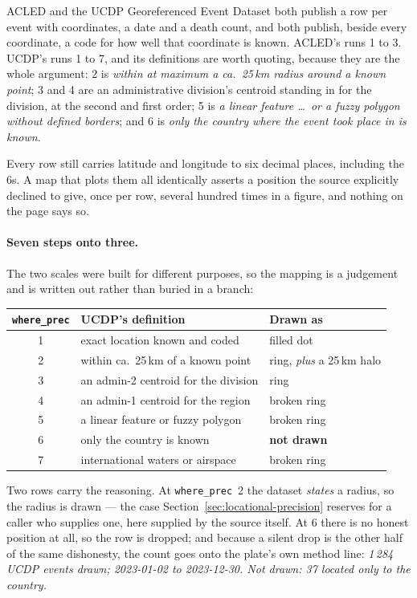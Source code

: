 \documentclass[11pt]{article}
\begin{document}
ACLED \parencite{acled-codebook} and the UCDP Georeferenced Event Dataset
\parencite{sundberg-ucdp-ged, hogbladh-ged-codebook} both publish a row per
event with coordinates, a date and a death count, and both publish, beside
every coordinate, a code for how well that coordinate is known. ACLED's
runs 1 to 3. UCDP's runs 1 to 7, and its definitions are worth quoting,
because they are the whole argument: 2 is \emph{within at maximum a ca.\
25\,km radius around a known point}; 3 and 4 are an administrative
division's centroid standing in for the division, at the second and first
order; 5 is \emph{a linear feature \dots\ or a fuzzy polygon without
defined borders}; and 6 is \emph{only the country where the event took
place in is known}.

Every row still carries latitude and longitude to six decimal places,
including the 6s. A map that plots them all identically asserts a position
the source explicitly declined to give, once per row, several hundred times
in a figure, and nothing on the page says so.

\paragraph{Seven steps onto three.} The two scales were built for different
purposes, so the mapping is a judgement and is written out rather than
buried in a branch:

\begin{center}
\begin{tabular}{@{}cll@{}}
\toprule
\texttt{where\_prec} & UCDP's definition & Drawn as \\
\midrule
1 & exact location known and coded & filled dot \\
2 & within ca.\ 25\,km of a known point & ring, \emph{plus} a 25\,km halo \\
3 & an admin-2 centroid for the division & ring \\
4 & an admin-1 centroid for the region & broken ring \\
5 & a linear feature or fuzzy polygon & broken ring \\
6 & only the country is known & \textbf{not drawn} \\
7 & international waters or airspace & broken ring \\
\bottomrule
\end{tabular}
\end{center}

Two rows carry the reasoning. At \texttt{where\_prec}~2 the dataset
\emph{states} a radius, so the radius is drawn --- the case
Section~\ref{sec:locational-precision} reserves for a caller who supplies
one, here supplied by the source itself. At 6 there is no honest position
at all, so the row is dropped; and because a silent drop is the other half
of the same dishonesty, the count goes onto the plate's own method line:
\emph{1\,284 UCDP events drawn; 2023-01-02 to 2023-12-30. Not drawn: 37
located only to the country.}
\end{document}
